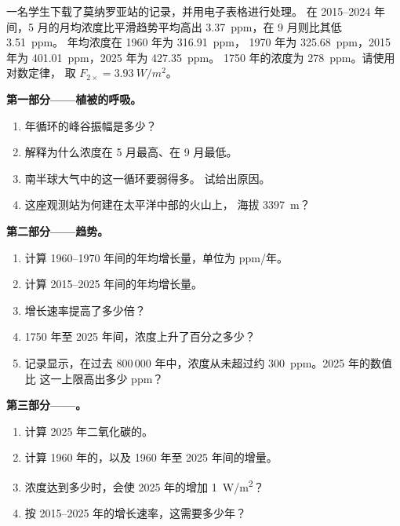\begin{problem}
\label{pb:g12:climate-change:1}
一名学生下载了莫纳罗亚站的记录，并用电子表格进行处理。
在 2015--2024 年间，5 月的月均浓度比平滑趋势平均高出
\qty{3.37}{ppm}，在 9 月则比其低 \qty{3.51}{ppm}。
年均浓度在 1960 年为 \qty{316.91}{ppm}，
1970 年为 \qty{325.68}{ppm}，2015 年为 \qty{401.01}{ppm}，2025 年为 \qty{427.35}{ppm}。
1750 年的浓度为 \qty{278}{ppm}。请使用对数定律，
取 $F_{2\times} = \qty{3.93}{W/m^2}$。

\medskip
\noindent\textbf{第一部分——植被的呼吸。}
\begin{enumerate}
  \item 年循环的峰谷振幅是多少？
  \item 解释为什么浓度在 5 月最高、在
        9 月最低。
  \item 南半球大气中的这一循环要弱得多。
        试给出原因。
  \item 这座观测站为何建在太平洋中部的火山上，
        海拔 \qty{3397}{m}？
\end{enumerate}

\medskip
\noindent\textbf{第二部分——趋势。}
\begin{enumerate}[resume]
  \item 计算 1960--1970 年间的年均增长量，单位为 ppm/年。
  \item 计算 2015--2025 年间的年均增长量。
  \item 增长速率提高了多少倍？
  \item 1750 年至
        2025 年间，浓度上升了百分之多少？
  \item {}记录显示，在过去 800\,000 年中，浓度从未超过约
        \qty{300}{ppm}。2025 年的数值比
        这一上限高出多少 ppm？
\end{enumerate}

\medskip
\noindent\textbf{第三部分——。}
\begin{enumerate}[resume]
  \item 计算 2025 年二氧化碳的。
  \item 计算 1960 年的，以及 1960 年至
        2025 年间的增量。
  \item 浓度达到多少时，会使 2025 年的增加 \qty{1}{W/m^2}？
  \item 按 2015--2025 年的增长速率，这需要多少年？
\end{enumerate}


\end{problem}
